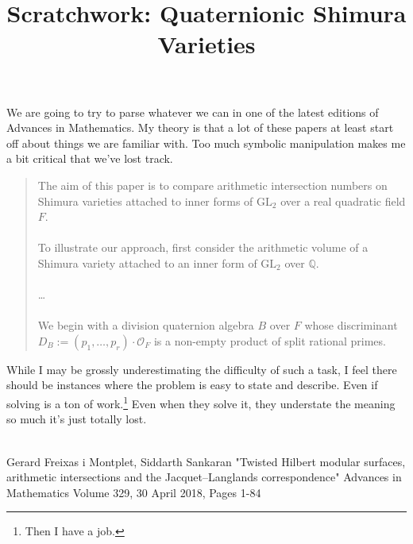 \documentclass[12pt]{article}
\title{Scratchwork: Quaternionic Shimura Varieties}
\date{}
\begin{document}

\sffamily

\maketitle

\noindent We are going to try to parse whatever we can in one of the latest editions of Advances in Mathematics.  My theory is that a lot of these papers at least start off about things we are familiar with.  Too much symbolic manipulation makes me a bit critical that we've lost track. 
\begin{quotation}
The aim of this paper is to compare arithmetic intersection numbers on Shimura varieties attached to inner forms of $\text{GL}_2$ over a real quadratic field $F$. \\ \\
To illustrate our approach, first consider the arithmetic volume of a Shimura variety attached to an inner form of $\text{GL}_2$ over $\mathbb{Q}$. \\ \\ 
\dots \\\\
We begin with a division quaternion algebra $B$ over $F$  whose discriminant $D_B := (p_1,\dots,p_r)\cdot\mathcal{O}_F$ is a non-empty product of split rational primes.
\end{quotation}
While I may be grossly underestimating the difficulty of such a task, I feel there should be instances where the problem is easy to state and describe.  Even if solving is a ton of work.\footnote{Then I have a job.} Even when they solve it, they understate the meaning so much it's just totally lost.\\ \\


\vfill

\begin{thebibliography}{}

\item Gerard Freixas i Montplet, Siddarth Sankaran "Twisted Hilbert modular surfaces, arithmetic intersections and the Jacquet–Langlands correspondence" Advances in Mathematics
Volume 329, 30 April 2018, Pages 1-84

\end{thebibliography}
\end{document}
